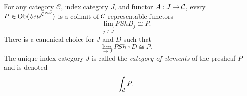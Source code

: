 \begin{frame}
\iftoggle{thmsty}{
\begin{definition}
\label{definition-category-of-elements}
}{}
For any category $\mathcal{C}$, index category $J$, and functor $A:J \rightarrow {\mathcal C}$, every $P \in \mathop{\rm Ob}\nolimits(\textit{Sets}^{{\mathcal C}^{opp}})$ is a colimit of ${\mathcal C}$-representable functors
$$
\lim\limits_{\overrightarrow{j \in J}} PSh D_j \cong P.
$$
There is a canonical choice for $J$ and $D$ such that
$$
\lim\limits_{\rightarrow{J}} PSh \circ D \cong P.
$$
The unique index category $J$ is called the {\it category of elements} of the presheaf $P$ and is denoted
$$
\int_{{\mathcal C}} P.
$$
\end{frame}